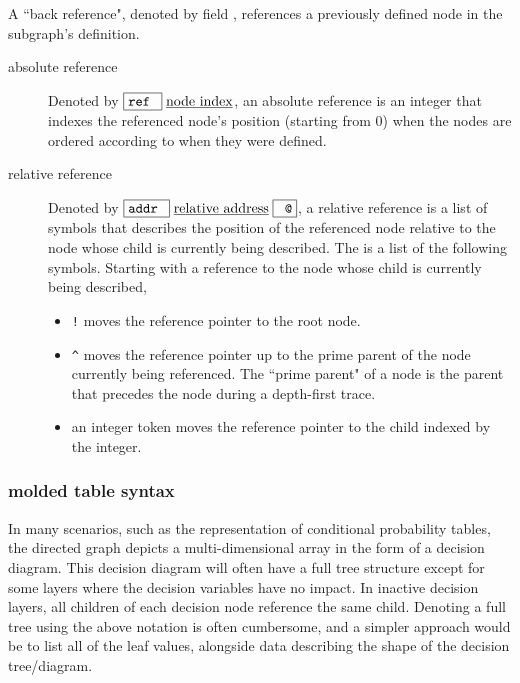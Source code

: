 \documentclass{article}
\newcommand{\literal}[1]{\fbox{\texttt{#1}}}
\begin{document}
A ``back reference", denoted by field \underline{}, references a previously defined node in the subgraph's definition. 

\begin{description}
\item[absolute reference] Denoted by \(\literal{ref }\;\underline{\text{node index}}\), an absolute reference is an integer that indexes the referenced node's position (starting from 0) when the nodes are ordered according to when they were defined. 
\item[relative reference] Denoted by \(\literal{addr }\;\underline{\text{relative address}}\;\literal{ @}\), a relative reference is a list of symbols that describes the position of the referenced node relative to the node whose child is currently being described. The \underline{} is a list of the following symbols. Starting with a reference to the node whose child is currently being described, 
\begin{itemize}
\item \texttt{!} moves the reference pointer to the root node. 
\item \texttt{\^} moves the reference pointer up to the prime parent of the node currently being referenced. The ``prime parent" of a node is the parent that precedes the node during a depth-first trace.
\item an integer token moves the reference pointer to the child indexed by the integer. 
\end{itemize}
\end{description}

\subsubsection{molded table syntax}

In many scenarios, such as the representation of conditional probability tables, the directed graph depicts a multi-dimensional array in the form of a decision diagram. This decision diagram will often have a full tree structure except for some layers where the decision variables have no impact. In inactive decision layers, all children of each decision node reference the same child. Denoting a full tree using the above notation is often cumbersome, and a simpler approach would be to list all of the leaf values, alongside data describing the shape of the decision tree/diagram. 
\end{document}
